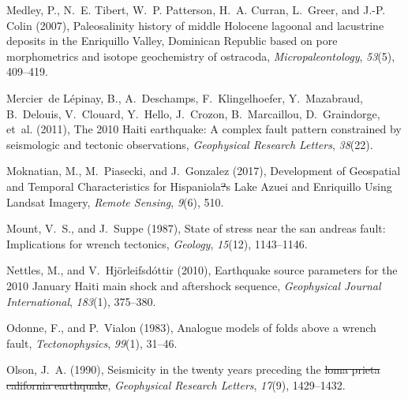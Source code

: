 \documentclass[linenumbers,draft]{agujournal}
\providecommand{\DIFaddtex}[1]{{\protect\color{blue}\uwave{#1}}} %
\providecommand{\DIFdeltex}[1]{{\protect\color{red}\sout{#1}}}                      %
\providecommand{\DIFaddbegin}{} %
\providecommand{\DIFaddend}{} %
\providecommand{\DIFdelbegin}{} %
\providecommand{\DIFdelend}{} %
\providecommand{\DIFadd}[1]{\texorpdfstring{\DIFaddtex{#1}}{#1}} %
\providecommand{\DIFdel}[1]{\texorpdfstring{\DIFdeltex{#1}}{}} %
\begin{document}
\begin{thebibliography}{65}
Medley, P., N.~E. Tibert, W.~P. Patterson, H.~A. Curran, L.~Greer, and J.-P.
  Colin (2007), {Paleosalinity history of middle Holocene lagoonal and
  lacustrine deposits in the Enriquillo Valley, Dominican Republic based on
  pore morphometrics and isotope geochemistry of ostracoda},
  \textit{Micropaleontology}, \textit{53}(5), 409--419.

Mercier~de L{\'e}pinay, B., A.~Deschamps, F.~Klingelhoefer, Y.~Mazabraud,
  B.~Delouis, V.~Clouard, Y.~Hello, J.~Crozon, B.~Marcaillou, D.~Graindorge,
  et~al. (2011), {The 2010 Haiti earthquake: A complex} fault pattern
  constrained by seismologic and tectonic observations, \textit{Geophysical
  Research Letters}, \textit{38}(22).

Moknatian, M., M.~Piasecki, and J.~Gonzalez (2017), {Development of Geospatial
  and Temporal Characteristics for Hispaniola\DIFdelbegin \DIFdel{?}\DIFdelend \DIFaddbegin \DIFadd{'}\DIFaddend s Lake Azuei and Enriquillo Using
  Landsat Imagery}, \textit{Remote Sensing}, \textit{9}(6), 510.

Mount, V.~S., and J.~Suppe (1987), State of stress near the san andreas fault:
  Implications for wrench tectonics, \textit{Geology}, \textit{15}(12),
  1143--1146.

Nettles, M., and V.~Hj{\"o}rleifsd{\'o}ttir (2010), Earthquake source
  parameters for the 2010 {January Haiti} main shock and aftershock sequence,
  \textit{Geophysical Journal International}, \textit{183}(1), 375--380.

Odonne, F., and P.~Vialon (1983), Analogue models of folds above a wrench
  fault, \textit{Tectonophysics}, \textit{99}(1), 31--46.

Olson, J.~A. (1990), \DIFaddbegin {\DIFaddend Seismicity in the twenty years preceding the \DIFdelbegin \DIFdel{loma prieta
  california earthquake}\DIFdelend \DIFaddbegin \DIFadd{Loma Prieta
  California Earthquake}}\DIFaddend , \textit{Geophysical Research Letters},
  \textit{17}(9), 1429--1432.


\end{thebibliography}
\end{document}
